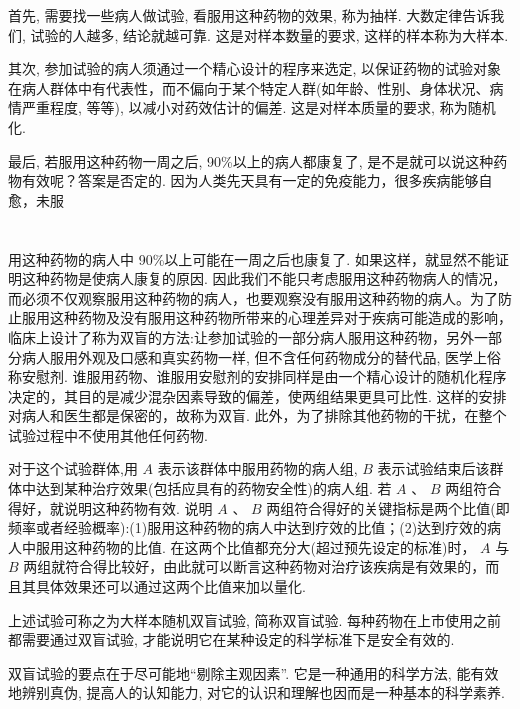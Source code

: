 \documentclass[10pt]{article}
\begin{document}
首先, 需要找一些病人做试验, 看服用这种药物的效果, 称为抽样. 大数定律告诉我们, 试验的人越多, 结论就越可靠. 这是对样本数量的要求, 这样的样本称为大样本.

其次, 参加试验的病人须通过一个精心设计的程序来选定, 以保证药物的试验对象在病人群体中有代表性，而不偏向于某个特定人群(如年龄、性别、身体状况、病情严重程度, 等等), 以减小对药效估计的偏差. 这是对样本质量的要求, 称为随机化.

最后, 若服用这种药物一周之后, 90\%以上的病人都康复了, 是不是就可以说这种药物有效呢？答案是否定的. 因为人类先天具有一定的免疫能力，很多疾病能够自愈，未服

\section*{}

\section*{}

用这种药物的病人中 90\%以上可能在一周之后也康复了. 如果这样，就显然不能证明这种药物是使病人康复的原因. 因此我们不能只考虑服用这种药物病人的情况，而必须不仅观察服用这种药物的病人，也要观察没有服用这种药物的病人。为了防止服用这种药物及没有服用这种药物所带来的心理差异对于疾病可能造成的影响，临床上设计了称为双盲的方法:让参加试验的一部分病人服用这种药物，另外一部分病人服用外观及口感和真实药物一样, 但不含任何药物成分的替代品, 医学上俗称安慰剂. 谁服用药物、谁服用安慰剂的安排同样是由一个精心设计的随机化程序决定的，其目的是减少混杂因素导致的偏差，使两组结果更具可比性. 这样的安排对病人和医生都是保密的，故称为双盲. 此外，为了排除其他药物的干扰，在整个试验过程中不使用其他任何药物.

对于这个试验群体,用 \(A\) 表示该群体中服用药物的病人组, \(B\) 表示试验结束后该群体中达到某种治疗效果(包括应具有的药物安全性)的病人组. 若 \(A\text{ 、 }B\) 两组符合得好，就说明这种药物有效. 说明 \(A\text{ 、 }B\) 两组符合得好的关键指标是两个比值(即频率或者经验概率):(1)服用这种药物的病人中达到疗效的比值；(2)达到疗效的病人中服用这种药物的比值. 在这两个比值都充分大(超过预先设定的标准)时， \(A\) 与 \(B\) 两组就符合得比较好，由此就可以断言这种药物对治疗该疾病是有效果的，而且其具体效果还可以通过这两个比值来加以量化.

上述试验可称之为大样本随机双盲试验, 简称双盲试验. 每种药物在上市使用之前都需要通过双盲试验, 才能说明它在某种设定的科学标准下是安全有效的.

双盲试验的要点在于尽可能地“剔除主观因素”. 它是一种通用的科学方法, 能有效地辨别真伪, 提高人的认知能力, 对它的认识和理解也因而是一种基本的科学素养.
\end{document}
